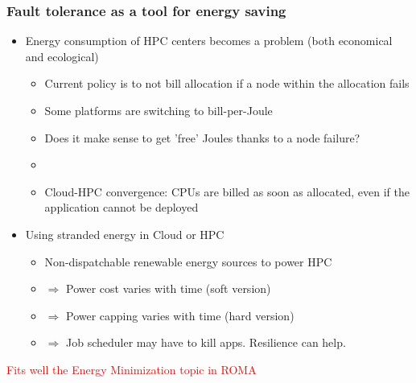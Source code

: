 \begin{frame}
  \frametitle{Fault tolerance as a tool for energy saving}

  \begin{itemize}
  \item Energy consumption of HPC centers becomes a problem (both economical and ecological)
    \begin{itemize}
    \item Current policy is to not bill allocation if a node within the allocation fails
    \item Some platforms are switching to bill-per-Joule
    \item Does it make sense to get 'free' Joules thanks to a node failure?
    \item[] ~
    \item Cloud-HPC convergence: CPUs are billed as soon as allocated, even if the application cannot be deployed
    \end{itemize}
  \item Using stranded energy in Cloud or HPC
    \begin{itemize}
    \item Non-dispatchable renewable energy sources to power HPC
    \item $\Rightarrow$ Power cost varies with time (soft version)
    \item $\Rightarrow$ Power capping varies with time (hard version)
    \item $\Rightarrow$ Job scheduler may have to kill apps. Resilience can help.
    \end{itemize}
  \end{itemize}
  \begin{center}
    \textcolor{red}{Fits well the Energy Minimization topic in ROMA}
  \end{center}
\end{frame}

